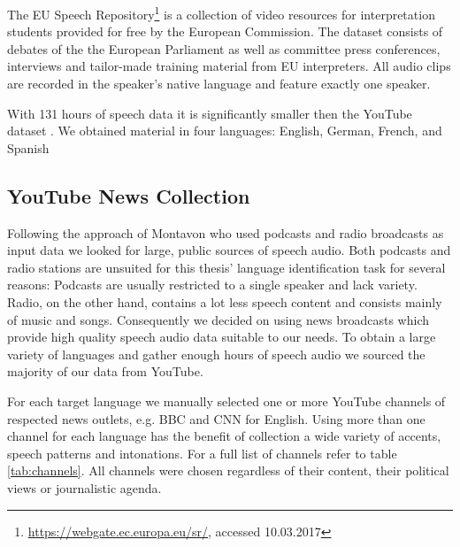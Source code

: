 	The EU Speech Repository\footnote{\url{https://webgate.ec.europa.eu/sr/}, accessed 10.03.2017} is a collection of video resources for interpretation students provided for free by the European Commission. The dataset consists of debates of the the European Parliament as well as committee press conferences, interviews and tailor-made training material from EU interpreters. All audio clips are recorded in the speaker's native language and feature exactly one speaker.
	
		With 131 hours of speech data it is significantly smaller then the YouTube dataset . We obtained material in four languages: English, German, French, and Spanish

\subsection{YouTube News Collection}
\label{sec:youtube_news}

	Following the approach of Montavon \cite{montavon2009deep} who used podcasts and radio broadcasts as input data we looked for large, public sources of speech audio. Both podcasts and radio stations are unsuited for this thesis' language identification task for several reasons: Podcasts are usually restricted to a single speaker and lack variety. Radio, on the other hand, contains a lot less speech content and consists mainly of music and songs. Consequently we decided on using news broadcasts which provide high quality speech audio data suitable to our needs. To obtain a large variety of languages and gather enough hours of speech audio we sourced the majority of our data from YouTube. 
	
	For each target language we manually selected one or more YouTube channels of respected news outlets, e.g. BBC and CNN for English. Using more than one channel for each language has the benefit of collection a wide variety of accents, speech patterns and intonations. For a full list of channels refer to table \ref{tab:channels}. All channels were chosen regardless of their content, their political views or journalistic agenda.
	
